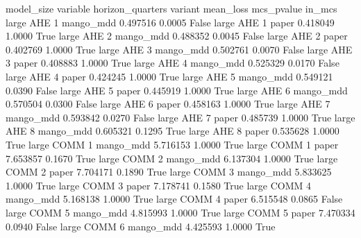 model_size variable  horizon_quarters               variant     mean_loss  mcs_pvalue  in_mcs
     large      AHE                 1             mango_mdd      0.497516      0.0005   False
     large      AHE                 1                 paper      0.418049      1.0000    True
     large      AHE                 2             mango_mdd      0.488352      0.0045   False
     large      AHE                 2                 paper      0.402769      1.0000    True
     large      AHE                 3             mango_mdd      0.502761      0.0070   False
     large      AHE                 3                 paper      0.408883      1.0000    True
     large      AHE                 4             mango_mdd      0.525329      0.0170   False
     large      AHE                 4                 paper      0.424245      1.0000    True
     large      AHE                 5             mango_mdd      0.549121      0.0390   False
     large      AHE                 5                 paper      0.445919      1.0000    True
     large      AHE                 6             mango_mdd      0.570504      0.0300   False
     large      AHE                 6                 paper      0.458163      1.0000    True
     large      AHE                 7             mango_mdd      0.593842      0.0270   False
     large      AHE                 7                 paper      0.485739      1.0000    True
     large      AHE                 8             mango_mdd      0.605321      0.1295    True
     large      AHE                 8                 paper      0.535628      1.0000    True
     large     COMM                 1             mango_mdd      5.716153      1.0000    True
     large     COMM                 1                 paper      7.653857      0.1670    True
     large     COMM                 2             mango_mdd      6.137304      1.0000    True
     large     COMM                 2                 paper      7.704171      0.1890    True
     large     COMM                 3             mango_mdd      5.833625      1.0000    True
     large     COMM                 3                 paper      7.178741      0.1580    True
     large     COMM                 4             mango_mdd      5.168138      1.0000    True
     large     COMM                 4                 paper      6.515548      0.0865   False
     large     COMM                 5             mango_mdd      4.815993      1.0000    True
     large     COMM                 5                 paper      7.470334      0.0940   False
     large     COMM                 6             mango_mdd      4.425593      1.0000    True
